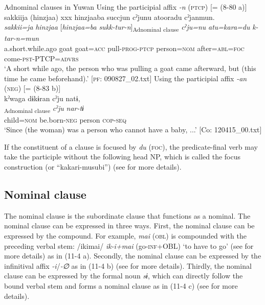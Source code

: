 \ea\label{ex:11-3}  Adnominal clauses in Yuwan
  \ea Using the participial affix \textit{{}-n} (\textsc{ptcp}) [= (8-80 a)]\\
   \glll sakkiija  (hinzjaa)  xxx  hinzjaaba  succjun cˀjunu  atooradu  cˀjanmun.\\
    \textit{sakkii=ja}  \textit{hinzjaa}  {}  [\textit{hinzjaa=ba}  \textit{sukk-tur-{n}}]\textsubscript{Adnominal clause}   \textit{cˀju=nu}  \textit{atu=kara=du}  \textit{k-tar-n=mun}\\
    a.short.while.ago  goat  {}  goat=\textsc{acc}  pull-\textsc{prog}-\textsc{ptcp}  person=\textsc{nom}  after=\textsc{abl}=\textsc{foc}  come-\textsc{pst}-PTCP=\textsc{advrs}\\
   \glt ‘A short while ago, the person who was pulling a goat came afterward, but (this time he came beforehand).’    [\textsc{pf}: 090827\_02.txt]
  \ex Using the participial affix \textit{{}-an} (\textsc{neg}) [= (8-83 b)]\\
   \glll kˀwaga  dɨkɨran  cˀju  natɨ,\\
    [\textit{kˀwa=ga}  \textit{dɨkɨr-\Highlight{an}}]\textsubscript{Adnominal clause}  \textit{cˀju}  \textit{nar-tɨ}\\
    child=\textsc{nom}  be.born-\textsc{neg}  person  \textsc{cop}-\textsc{seq}\\
   \glt  ‘Since (the woman) was a person who cannot have a baby, ...’    [Co: 120415\_00.txt]
\z
\z

If the constituent of a clause is focused by \textit{du} (\textsc{foc}), the predicate-final verb may take the participle without the following head NP, which is called the focus construction (or “kakari-musubi”) (see  for more details).

\subsection{Nominal clause}\label{sec:11.1.3}

The nominal clause is the subordinate clause that functions as a nominal. The nominal clause can be expressed in three ways. First, the nominal clause can be expressed by the compound. For example, \textit{mai} (\textsc{obl}) is compounded with the preceding verbal stem: /ikimai/ \textit{ik-i+mai} (go-\textsc{inf}+OBL) ‘to have to go’ (see  for more details) as in (11-4 a). Secondly, the nominal clause can be expressed by the infinitival affix \textit{{}-i}/\textit{{}-∅} as in (11-4 b) (see  for more details). Thirdly, the nominal clause can be expressed by the formal noun \textit{sɨ}, which can directly follow the bound verbal stem and forms a nominal clause as in (11-4 c) (see  for more details).

